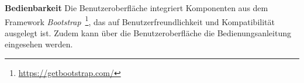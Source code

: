 \noindent\textbf{Bedienbarkeit} Die Benutzeroberfläche integriert Komponenten aus dem Framework \textit{Bootstrap}~\footnote{\hspace{1.5mm}\url{https://getbootstrap.com/}}, das auf 
Benutzerfreundlichkeit und Kompatibilität ausgelegt ist. Zudem kann über die Benutzeroberfläche die Bedienungsanleitung eingesehen werden.
